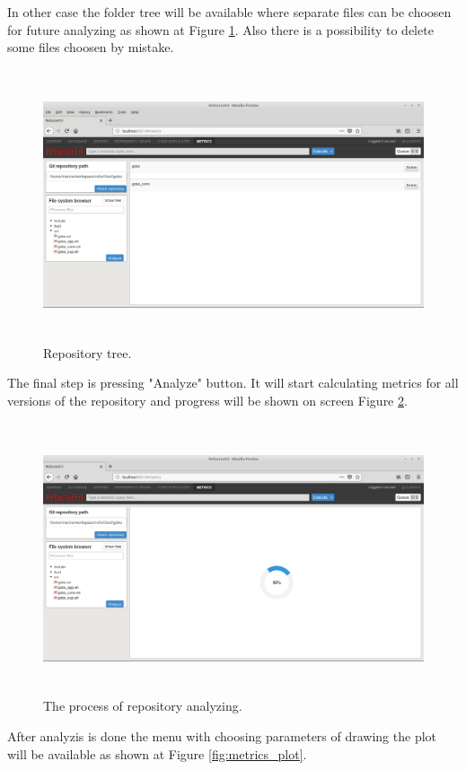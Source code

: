 In other case the folder tree will be available where separate files can be choosen for future analyzing as shown at Figure \ref{fig:metrics_files}. Also there is a possibility to delete some files choosen by mistake.

\begin{figure}[h]
	\includegraphics[height=80mm]{figures/files.png}
	\caption{Repository tree.}
	\label{fig:metrics_files}
\end{figure}

The final step is pressing "Analyze" button. It will start calculating metrics for all versions of the repository and progress will be shown on screen Figure \ref{fig:metrics_analyze}. 

\begin{figure}[h]
	\includegraphics[height=80mm]{figures/analyze.png}
	\caption{The process of repository analyzing.}
	\label{fig:metrics_analyze}
\end{figure}

After analyzis is done the menu with choosing parameters of drawing the plot will be available as shown at Figure \ref{fig:metrics_plot}.

